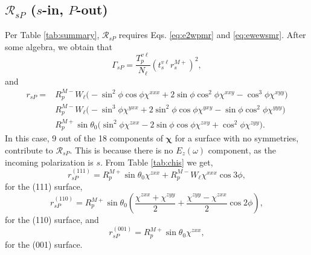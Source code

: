 
\subsection{\texorpdfstring{$\mathcal{R}_{sP}$ ($s$-in, $P$-out)}
{RsP (s-in, P-out)}}
\label{sec:RsP}

Per Table \ref{tab:summary}, $\mathcal{R}_{sP}$ requires Eqs. \eqref{eq:e2wpmr}
and \eqref{eq:ewewsmr}. After some algebra, we obtain that
\begin{equation}\label{mcv4}
\Gamma_{sP}=
\frac{T^{v\ell}_{p}}{N_{\ell}}
\left(t^{v\ell}_{s}r^{M+}_{s}\right)^{2},
\end{equation}
and
\begin{equation}
\begin{split}
r_{sP} = 
& R^{M-}_{p}W_{\ell}
\big(
- \sin^{2}\phi\cos\phi\chi^{xxx}
+ 2\sin\phi\cos^{2}\phi\chi^{xxy}
- \cos^{3}\phi\chi^{xyy}
\big)\\
& R^{M-}_{p}W_{\ell}
\big(
- \sin^{3}\phi\chi^{yxx}
+ 2\sin^{2}\phi\cos\phi\chi^{yxy}
- \sin\phi\cos^{2}\phi\chi^{yyy}
\big)\\
& R^{M+}_{p}\sin\theta_{0}
\big(
  \sin^{2}\phi\chi^{zxx}
- 2\sin\phi\cos\phi\chi^{zxy}
+ \cos^{2}\phi\chi^{zyy}
\big).
\end{split}
\end{equation}
In this case, 9 out of the 18 components of $\boldsymbol{\chi}$ for a surface
with no symmetries, contribute to $\mathcal{R}_{sP}$. This is because there is
no $E_{z}(\omega)$ component, as the incoming polarization is $s$. From Table
\ref{tab:chis} we get,
\begin{equation}\label{eq:rsp111}
r^{(111)}_{sP} = 
R^{M+}_{p}\sin\theta_{0}\chi^{zxx} +
R^{M-}_{p}W_{\ell}\chi^{xxx}\cos3\phi,
\end{equation}
for the (111) surface,
\begin{equation}\label{eq:rsp110}
r^{(110)}_{sP} = 
R^{M+}_{p}\sin\theta_{0}
\left(
\frac{\chi^{zxx} + \chi^{zyy}}{2} + \frac{\chi^{zyy} - \chi^{zxx}}{2}\cos2\phi
\right),
\end{equation}
for the (110) surface, and
\begin{equation}\label{eq:rsp001}
r^{(001)}_{sP} = R^{M+}_{p}\sin\theta_{0}\chi^{zxx},
\end{equation}
for the (001) surface.



